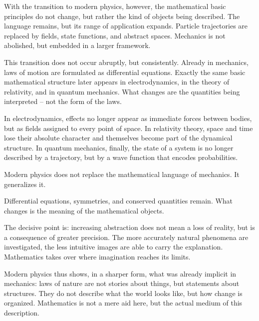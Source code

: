 With the transition to modern physics,
however, the mathematical basic principles do not change,
but rather the kind of objects being described.
The language remains,
but its range of application expands.
Particle trajectories are replaced by fields,
state functions, and abstract spaces.
Mechanics is not abolished,
but embedded in a larger framework.

This transition does not occur abruptly,
but consistently.
Already in mechanics, laws of motion
are formulated as differential equations.
Exactly the same basic mathematical structure later appears
in electrodynamics,
in the theory of relativity,
and in quantum mechanics.
What changes
are the quantities being interpreted --
not the form of the laws.

In electrodynamics, effects no longer appear
as immediate forces between bodies,
but as fields
assigned to every point of space.
In relativity theory, space and time lose their absolute character
and themselves become part of the dynamical structure.
In quantum mechanics, finally,
the state of a system is no longer described by a trajectory,
but by a wave function
that encodes probabilities.

\begin{DidacticBox}
	\label{box:newconcepts}
	Modern physics does not replace the mathematical language of mechanics.
	It generalizes it.
	
	Differential equations, symmetries,
	and conserved quantities
	remain.
	What changes
	is the meaning of the mathematical objects.
\end{DidacticBox}

The decisive point is:
increasing abstraction
does not mean a loss of reality,
but is a consequence of greater precision.
The more accurately natural phenomena are investigated,
the less intuitive images are able to carry the explanation.
Mathematics
takes over where imagination reaches its limits.

Modern physics thus shows, in a sharper form,
what was already implicit in mechanics:
laws of nature
are not stories about things,
but statements about structures.
They do not describe
what the world looks like,
but how change is organized.
Mathematics is not a mere aid here,
but the actual medium of this description.

